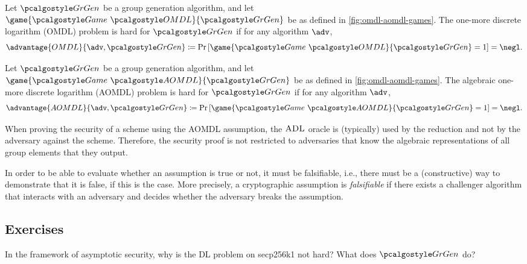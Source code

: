 \begin{definition}
  Let $\grgen$ be a group generation algorithm, and let $\game{\Game~\algo{OMDL}}{\grgen}$ be as defined in \autoref{fig:omdl-aomdl-games}.
  The one-more discrete logarithm (OMDL) problem is hard for $\grgen$ if for any \ppt algorithm $\adv$,
  \[
  \advantage{OMDL}{\adv, \grgen} \defeq \pr{\game{\Game~\algo{OMDL}}{\grgen} = 1} = \negl.
  \]
\end{definition}

\begin{definition}
  Let $\grgen$ be a group generation algorithm, and let $\game{\Game~\algo{AOMDL}}{\grgen}$ be as defined in \autoref{fig:omdl-aomdl-games}.
  The algebraic one-more discrete logarithm (AOMDL) problem is hard for $\grgen$ if for any \ppt algorithm $\adv$,
  \[
  \advantage{AOMDL}{\adv, \grgen} \defeq \pr{\game{\Game~\algo{AOMDL}}{\grgen} = 1} = \negl.
  \]
\end{definition}

\begin{remark}
  When proving the security of a scheme using the AOMDL assumption, the ${\normalfont\textsc{ADL}}$ oracle is (typically) used by the reduction and not by the adversary against the scheme.
  Therefore, the security proof is not restricted to adversaries that know the algebraic representations of all group elements that they output.
\end{remark}

\begin{remark}
  In order to be able to evaluate whether an assumption is true or not, it must be falsifiable, i.e., there must be a (constructive) way to demonstrate that it is false, if this is the case.
  More precisely, a cryptographic assumption is \emph{falsifiable} if there exists a \ppt challenger algorithm that interacts with an adversary and decides whether the adversary breaks the assumption.
\end{remark}

\subsection{Exercises}

\begin{exercise}
  In the framework of asymptotic security, why is the DL problem on secp256k1 not hard? What does $\grgen$ do?
\end{exercise}

